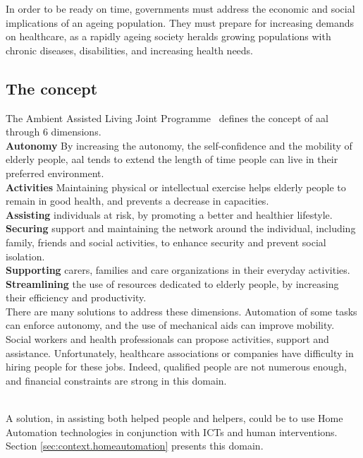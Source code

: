 In order to be ready on time, governments must address the economic and social implications of an ageing population. They must prepare for increasing demands on healthcare, as a rapidly ageing society heralds growing populations with chronic diseases, disabilities, and increasing health needs.\\

\subsection{The concept}
\label{subsec:aalConcepts}

The Ambient Assisted Living Joint Programme~\cite{jointAALProgram} defines the concept of \gls{aal} through 6 dimensions.\\
{\bf Autonomy} By increasing the autonomy, the self-confidence and the mobility of elderly people, \gls{aal} tends to extend the length of time people can live in their preferred environment. \\
{\bf Activities} Maintaining physical or intellectual exercise helps elderly people to remain in good health, and prevents a decrease in capacities.\\
{\bf Assisting} individuals at risk, by promoting a better and healthier lifestyle.\\
{\bf Securing} support and maintaining the network around the individual, including family, friends and social activities, to enhance security and prevent social isolation.\\
{\bf Supporting} carers, families and care organizations in their everyday activities.\\
{\bf Streamlining} the use of resources dedicated to elderly people, by increasing their efficiency and productivity.\\

There are many solutions to address these dimensions. Automation of some tasks can enforce autonomy, and the use of mechanical aids can improve mobility. Social workers and health professionals can propose activities, support and assistance. Unfortunately, healthcare associations or companies have difficulty in hiring people for these jobs. Indeed, qualified people are not numerous enough, and financial constraints are strong in this domain.\\
~\vspace{0.5cm}

A solution, in assisting both helped people and helpers, could be to use Home Automation technologies in conjunction with ICTs and human interventions. Section \ref{sec:context.homeautomation} presents this domain.



